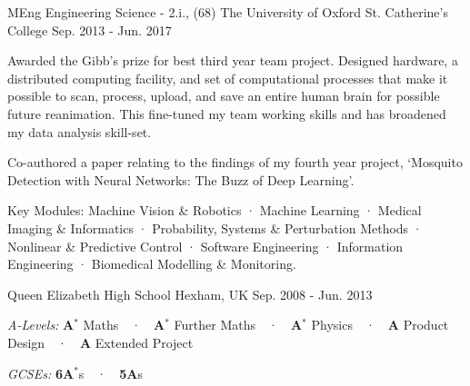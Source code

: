 \begin{cventries}
    
    \cventry
        {MEng Engineering Science - 2.i., (68)}
        {The University of Oxford}
        {St. Catherine's College}
        {Sep. 2013 - Jun. 2017}
        {
            \begin{cvitems}
                \item{Awarded the Gibb's prize for best third year team project. Designed hardware, a distributed computing facility, and set of computational processes that make it possible to scan, process, upload, and save an entire human brain for possible future reanimation. This fine-tuned my team working skills and has broadened my data analysis skill-set.}
                \item{Co-authored a paper relating to the findings of my fourth year project, `Mosquito Detection with Neural Networks: The Buzz of Deep Learning'.}
                \item{Key Modules: Machine Vision \& Robotics · Machine Learning · Medical Imaging \& Informatics · Probability, Systems \& Perturbation Methods · Nonlinear \& Predictive Control · Software Engineering · Information Engineering · Biomedical Modelling \& Monitoring.}
            \end{cvitems}
        }


    \cventry
        {}
        {Queen Elizabeth High School}
        {Hexham, UK}
        {Sep. 2008 - Jun. 2013}
        {\vspace{-0.5cm}
            \begin{cvitems}
                \item{\textit{A-Levels:} \textbf{A${{^*}}$} Maths~~·~~\textbf{A${{^*}}$} Further Maths~~·~~\textbf{A${{^*}}$} Physics~~·~~\textbf{A} Product Design~~·~~\textbf{A} Extended Project}
                \item{\textit{GCSEs:} \textbf{6A${{^*}}$}s~~·~~\textbf{5A}s}
            \end{cvitems}
        }

\end{cventries}
